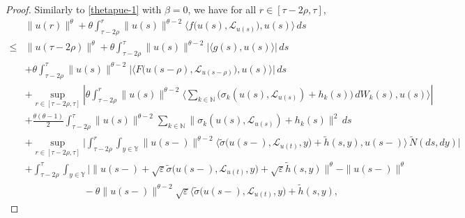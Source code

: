 \documentclass[11pt]{article}
\numberwithin{equation}{section}
\theoremstyle{plain}
\begin{document}
\begin{proof}
 Similarly to  \eqref{thetapue-1} with $\beta =0$, 
 we have for all 
 $ r \in [\tau- { 2}\rho,\tau]$,
 \begin{align}\label{pue-9}
 	& 
 	\|u(r)\|^{\theta}
 	+ \theta \int_{\tau- { 2}\rho}^{r}
 	\|u(s)\|^{\theta-2}
 	\big\langle f\big(u(s), \mathcal{L}_{u(s)}\big), u(s) \big\rangle
 	\, ds                                                \nonumber\\
 	\le &
 	\|u(\tau- 2\rho)\|^{\theta}
    + \theta \int_{\tau - 2\rho}^{\tau}
 	\|u(s)\|^{\theta-2}
 	\big| \langle g(s), u(s) \rangle \big| \, ds       \nonumber\\
 	& + \theta \int_{\tau - 2\rho}^{\tau}
 	\|u(s)\|^{\theta-2}
 	\big|
 	\big\langle
 	F\big(u(s - \rho), \mathcal{L}_{u(s-\rho)}\big),
 	u(s)
 	\big\rangle
 	\big| \, ds                                        \nonumber\\
 	& + \sup_{r \in [\tau - 2\rho,\tau]}
 	\left|
 	\theta \int_{\tau - 2\rho}^{r}
 	\|u(s)\|^{\theta-2}
 	\big\langle
 	\sum_{k \in \mathbb{N}}
 	\big( \sigma_k(u(s), \mathcal{L}_{u(s)}) + h_k(s) \big)
 	\, dW_k(s),
 	u(s)
 	\big\rangle
 	\right|                                              \nonumber\\
 	& + \frac{\theta(\theta-1)}{2}
 	\int_{\tau - 2\rho}^{\tau}
 	\|u(s)\|^{\theta-2}
 	\sum_{k \in \mathbb{N}}
 	\|\sigma_k(u(s), \mathcal{L}_{u(s)}) + h_k(s)\|^2 \, ds
 	\nonumber\\
 	& + \sup_{r \in [\tau - 2\rho,\tau]}
 	\Bigg| 
 	\int_{\tau - 2\rho}^{r} \int_{
 	y\in \mathbb{Y}
 	}
 	\|u(s-)\|^{\theta-2}
 	\big\langle
 	\widetilde{\sigma}\big(u(s-), \mathcal{L}_{u(t)}, y\big)
 	+ \widetilde{h}(s,y),
 	u(s-)
 	\big\rangle
 	\,\widetilde{N}(ds,dy)
 	\Bigg|                                               \nonumber\\
 	& + \int_{\tau - 2\rho}^{\tau} \int_{y \in \mathbb{Y} } 
 	 \Big|
 	                \big\| u(s-)
 	                          + \sqrt{\varepsilon} 
 	                               \widetilde{\sigma}\big( u(s-), \mathcal{L}_{u(t)}, y \big)
 	                         + \sqrt{\varepsilon} \widetilde{h}(s,y)
 	                \big\|^{\theta}
 	               - \|u(s-)\|^{\theta}   \nonumber\\
 	& \qquad\qquad\qquad
 	               - \theta \|u(s-)\|^{\theta-2}
 	                       \sqrt{\varepsilon}
 	                           \big\langle
 	                                      \widetilde{\sigma}\big(u(s-), \mathcal{L}_{u(t)}, y\big)
 	                                     + \widetilde{h}(s,y),

\end{align}
\end{proof}
\end{document}
